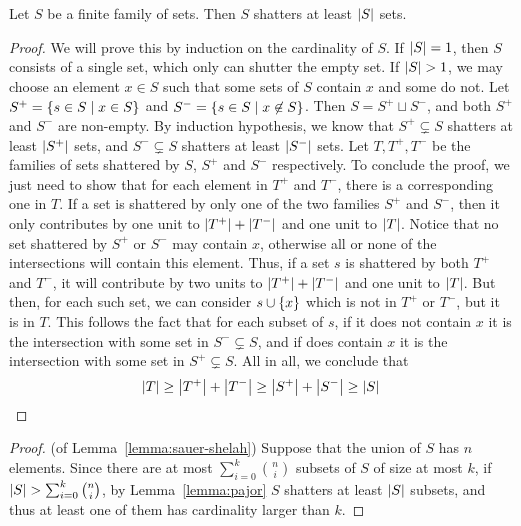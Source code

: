         \label{lemma:pajor}
            Let $S$ be a finite family of sets.
            Then $S$ shatters at least $\left| S \right|$ sets.
            \begin{proof}
                We will prove this by induction on the cardinality of $S$.
                If $\left| S \right| = 1$, then $S$ consists of a single set, which only can shutter the empty set.
                If $\left| S \right| > 1$, we may choose an element $x \in S$ such that some sets of $S$ contain $x$ and some do not.
                Let $S^+ = \left\{ s \in S \mid x \in S \right\}$ and $S^- = \left\{ s \in S \mid x \not\in S \right\}$.
                Then $S = S^+ \sqcup S^-$, and both $S^+$ and $S^-$ are non-empty.
                By induction hypothesis, we know that $S^+ \subsetneq S$ shatters at least $\left| S^+ \right|$ sets,
                and $S^- \subsetneq S$ shatters at least $\left| S^- \right|$ sets.
                Let $T, T^+, T^-$ be the families of sets shattered by $S$, $S^+$ and $S^-$ respectively.
                To conclude the proof, we just need to show that for each element in $T^+$ and $T^-$, there is a corresponding
                one in $T$.
                If a set is shattered by only one of the two families $S^+$ and $S^-$, then it only contributes by one unit
                to $\left| T^+ \right| + \left| T^- \right|$ and one unit to $\left| T \right|$.
                Notice that no set shattered by $S^+$ or $S^-$ may contain $x$, otherwise all or none of the intersections
                will contain this element.
                Thus, if a set $s$ is shattered by both $T^+$ and $T^-$, it will contribute by two units to
                $\left| T^+ \right| + \left| T^- \right|$ and one unit to $\left| T \right|$.
                But then, for each such set, we can consider $s \cup \left\{ x \right\}$ which is not in $T^+$ or $T^-$, but it is in $T$.
                This follows the fact that for each subset of $s$, if it does not contain $x$ it is the intersection with some
                set in $S^- \subsetneq S$, and if does contain $x$ it is the intersection with some set in $S^+ \subsetneq S$.
                All in all, we conclude that
                \[
                    \left| T \right| \geq \left| T^+ \right| + \left| T^- \right| \geq \left| S^+ \right| + \left| S^- \right|
                                    \geq \left| S \right|
                \]
            \end{proof}

        \begin{proof} (of Lemma~\ref{lemma:sauer-shelah})
            Suppose that the union of $S$ has $n$ elements.
            Since there are at most $\sum_{i=0}^k \binom{n}{i}$ subsets of $S$ of size at most $k$, if
            $\left| S \right| > \sum_{i=0}^k \binom{n}{i}$, by Lemma~\ref{lemma:pajor} $S$ shatters at least
            $\left| S \right|$ subsets, and thus at least one of them has cardinality larger than $k$.
        \end{proof}

